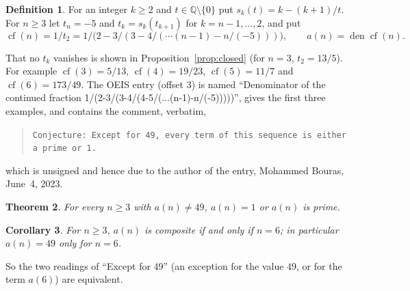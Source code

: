 \documentclass[11pt]{amsart}
\theoremstyle{plain}
\newtheorem{theorem}{Theorem}
\newtheorem{corollary}[theorem]{Corollary}
\theoremstyle{definition}
\newtheorem{definition}[theorem]{Definition}
\newcommand{\Q}{\mathbb{Q}}
\DeclareMathOperator{\den}{den}
\DeclareMathOperator{\cf}{cf}
\begin{document}
\begin{definition}\label{def:a}
For an integer $k\ge2$ and $t\in\Q\setminus\{0\}$ put $s_k(t)=k-(k+1)/t$. For $n\ge3$ let $t_n=-5$ and $t_k=s_k(t_{k+1})$ for $k=n-1,\dots,2$, and put
\[
  \cf(n)=1/t_2=1/\bigl(2-3/(3-4/(\cdots(n-1)-n/(-5)))\bigr),\qquad a(n)=\den\cf(n).
\]
\end{definition}

That no $t_k$ vanishes is shown in Proposition~\ref{prop:closed} (for $n=3$, $t_2=13/5$). For example $\cf(3)=5/13$, $\cf(4)=19/23$, $\cf(5)=11/7$ and $\cf(6)=173/49$.
The OEIS entry \cite{A363482} (offset $3$) is named ``Denominator of the continued fraction 1/(2-3/(3-4/(4-5/(...(n-1)-n/(-5)))))'', gives the first three examples, and contains the comment, verbatim,
\begin{quote}
\texttt{Conjecture: Except for 49, every term of this sequence is either a prime or 1.}
\end{quote}
which is unsigned and hence due to the author of the entry, Mohammed Bouras, June~4, 2023.

\begin{theorem}\label{thm:main}
For every $n\ge3$ with $a(n)\ne49$, $a(n)=1$ or $a(n)$ is prime.
\end{theorem}

\begin{corollary}\label{cor:49}
For $n\ge3$, $a(n)$ is composite if and only if $n=6$; in particular $a(n)=49$ only for $n=6$.
\end{corollary}

So the two readings of ``Except for 49'' (an exception for the value $49$, or for the term $a(6)$) are equivalent.
\end{document}
